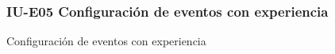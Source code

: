 
\subsubsection{IU-E05 Configuración de eventos con experiencia}


        {Configuración de eventos con experiencia}

\begin{comment}
\subsubsection{Elementos Relevantes}

    \begin{itemize}
    \item {\bf Lorem ipsum}
        ...
    \end{itemize}

\subsubsection{Acciones relevantes}

    \begin{itemize}
    \item {\bf Lorem ipsum}
        ...
    \end{itemize}
\end{comment}

\clearpage
